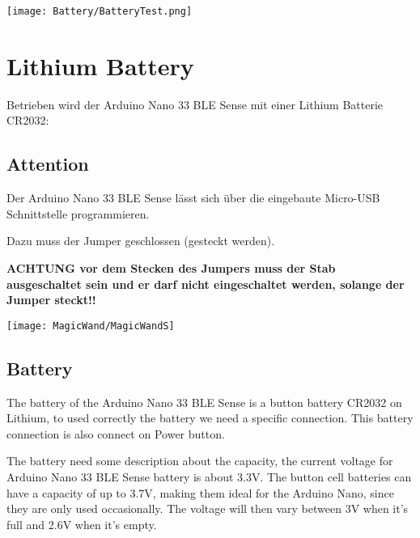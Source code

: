 \begin{center}
  \texttt{[image: Battery/BatteryTest.png]}
  \label{BildSpannungTest}
\end{center}

\section{Lithium Battery}


Betrieben wird der Arduino Nano 33 BLE Sense mit einer Lithium Batterie CR2032: \cite{Energizer:2018}
    
    

\subsection{Attention}


Der Arduino Nano 33 BLE Sense lässt sich über die eingebaute Micro-USB Schnittstelle programmieren.

Dazu muss  der Jumper geschlossen (gesteckt werden).


\textbf{ACHTUNG vor dem Stecken des Jumpers muss der Stab ausgeschaltet sein und er darf
    nicht eingeschaltet werden, solange der Jumper steckt!!}


\begin{center}
    
  \texttt{[image: MagicWand/MagicWandS]}
   \label{Figure:jumperconnection}
\end{center}







\subsection{Battery}

The battery of the Arduino Nano 33 BLE Sense is a button battery CR2032 on Lithium, to used correctly the battery we need a specific connection. This battery connection is also connect on Power button. 

The battery need some description about the capacity, the current voltage for Arduino Nano 33 BLE Sense battery is about 3.3V. The button cell batteries can have a capacity of up to 3.7V, making them ideal for the Arduino Nano, since they are only used occasionally. The voltage will then vary between 3V when it's full and 2.6V when it's empty. 


